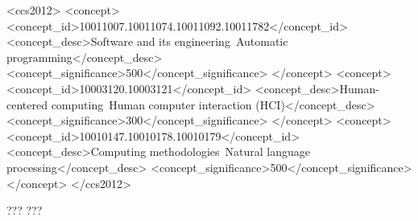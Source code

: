 \documentclass[acsmall,screen]{acmart}
\begin{document}
\begin{CCSXML}
<ccs2012>
   <concept>
       <concept_id>10011007.10011074.10011092.10011782</concept_id>
       <concept_desc>Software and its engineering~Automatic programming</concept_desc>
       <concept_significance>500</concept_significance>
       </concept>
   <concept>
       <concept_id>10003120.10003121</concept_id>
       <concept_desc>Human-centered computing~Human computer interaction (HCI)</concept_desc>
       <concept_significance>300</concept_significance>
       </concept>
   <concept>
       <concept_id>10010147.10010178.10010179</concept_id>
       <concept_desc>Computing methodologies~Natural language processing</concept_desc>
       <concept_significance>500</concept_significance>
       </concept>
 </ccs2012>
\end{CCSXML}



\received[revised]???
\received[accepted]???

\maketitle
\end{document}

